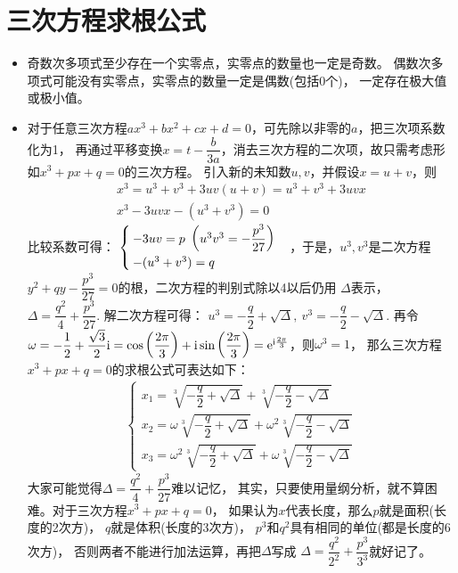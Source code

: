 \section{三次方程求根公式}
\begin{itemize}[leftmargin=\inteval{\myitemleftmargin}pt,itemsep=
   \inteval{\myitemitempsep}pt,topsep=\inteval{\myitemtopsep}pt]
\item 奇数次多项式至少存在一个实零点，实零点的数量也一定是奇数。
偶数次多项式可能没有实零点，实零点的数量一定是偶数(包括0个)，
一定存在极大值或极小值。

\item 对于任意三次方程$ ax^3+bx^2+cx+d=0 $，可先除以非零的$ a $，把三次项系数化为1，
再通过平移变换$ x=t-\dfrac{b}{3a} $，消去三次方程的二次项，故只需考虑形如$ x^3+px+q=0 $的三次方程。
引入新的未知数$ u,v $，并假设$ x=u+v $，则
\begin{gather*}
    x^3=u^3+v^3+3uv(u+v)=u^3+v^3+3uvx  \\
     x^3-3uvx-(u^3+v^3)=0
\end{gather*}
比较系数可得：
$ \begin{cases}
-3uv = p \ \left(u^3v^3=-\dfrac{p^3}{27} \right) \\
-(u^3+v^3) = q
\end{cases} \vspace{-4mm} $，于是，$ u^3,v^3 $是二次方程$ y^2+qy-\dfrac{p^3}{27}=0 $的根，二次方程的判别式除以4以后仍用
$ \Delta $表示，$ \Delta=\dfrac{q^2}{4}+\dfrac{p^3}{27} $. 解二次方程可得：
$ u^3=-\dfrac{q}{2} + \sqrt{\Delta},\ v^3=-\dfrac{q}{2} - \sqrt{\Delta}$.
再令$ \omega=-\dfrac{1}{2}+\dfrac{\sqrt{3}}{2}\mathrm{i} =
\cos\left(\dfrac{2\pi}{3}\right)+\mathrm{i}\sin\left(\dfrac{2\pi}{3}\right)
=\mathrm{e}^{\mathrm{i}\frac{2\pi}{3}}$，则$ \omega^3=1 $， 那么三次方程$ x^3+px+q=0 $的求根公式可表达如下：
\begin{align*}
\begin{cases}
    x_1= \sqrt[3]{-\dfrac{q}{2} + \sqrt{\Delta}}+
    \sqrt[3]{-\dfrac{q}{2} - \sqrt{\Delta}} \\
    x_2= \omega\sqrt[3]{-\dfrac{q}{2} + \sqrt{\Delta}}+
    \omega^2\sqrt[3]{-\dfrac{q}{2} - \sqrt{\Delta}} \\
    x_3= \omega^2\sqrt[3]{-\dfrac{q}{2} + \sqrt{\Delta}}+
    \omega\sqrt[3]{-\dfrac{q}{2} - \sqrt{\Delta}} 
\end{cases} 
\end{align*}
大家可能觉得$ \Delta=\dfrac{q^2}{4}+\dfrac{p^3}{27} $难以记忆，
其实，只要使用量纲分析，就不算困难。对于三次方程$ x^3+px+q=0 $，
如果认为$ x $代表长度，那么$ p $就是面积(长度的2次方)，
$ q $就是体积(长度的3次方)，
$ p^3 $和$ q^2 $具有相同的单位(都是长度的6次方)，
否则两者不能进行加法运算，再把$ \Delta $写成
$ \Delta=\dfrac{q^2}{2^2}+\dfrac{p^3}{3^3} $就好记了。


\end{itemize}

